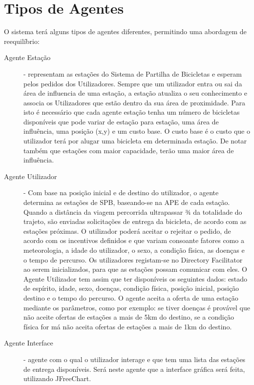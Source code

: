 \section{Tipos de Agentes}\label{sec:agentes}

O sistema terá alguns tipos de agentes diferentes, permitindo uma abordagem de reequilíbrio:

\begin{description}
\item [Agente Estação] - representam as estações do Sistema de Partilha de Bicicletas e esperam pelos pedidos dos Utilizadores. Sempre que um utilizador entra ou sai da área de influencia de uma estação, a estação atualiza o seu conhecimento e associa os Utilizadores que estão dentro da sua área de proximidade. Para isto é necessário que cada agente estação tenha um número de bicicletas disponíveis que pode variar de estação para estação, uma área de influência, uma posição (x,y) e um custo base. O custo base é o custo que o utilizador terá por alugar uma bicicleta em determinada estação. De notar também que estações com maior capacidade, terão uma maior área de influência.
\\
\item [Agente Utilizador] - Com base na posição inicial e de destino do utilizador, o agente determina as estações de SPB, baseando-se na APE de cada estação. Quando a distância da viagem percorrida ultrapassar ¾ da totalidade do trajeto, são enviadas solicitações de entrega da bicicleta,
de acordo com as estações próximas. O utilizador poderá aceitar o rejeitar o pedido, de acordo com os incentivos definidos e que variam
consoante fatores como a meteorologia, a idade do utilizador, o sexo, a condição física, as doenças e o tempo de percurso. Os utilizadores registam-se no Directory Facilitator ao serem inicializados, para que as estações possam comunicar com eles. O Agente Utilizador tem assim que ter disponíveis os seguintes dados:
estado de espírito, idade, sexo, doenças, condição física, posição inicial, posição destino e o tempo do percurso. O agente aceita a oferta de uma estação mediante os parâmetros, como por exemplo: se tiver doenças é provável que não aceite ofertas de estações a mais de 5km do destino, se a condição física for má não aceita ofertas de estações a mais de 1km do destino.
\\
\item [Agente Interface] - agente com o qual o utilizador interage e que tem uma lista das estações de entrega disponíveis. Será neste agente que a interface gráfica será feita, utilizando JFreeChart.

\end{description}
